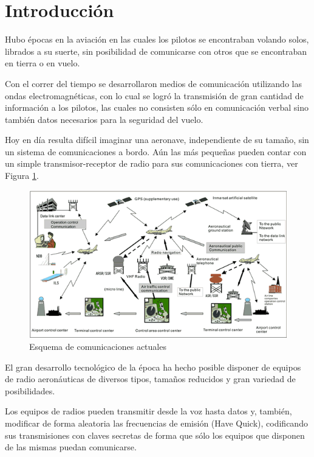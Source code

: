 \section{Introducci\'on}
\label{sec:comunicaciones.a.bordo.introduccion}

Hubo \'epocas en la aviaci\'on en las cuales los pilotos se encontraban volando solos, librados a su suerte, sin posibilidad de comunicarse con otros que se encontraban en tierra o en vuelo.

Con el correr del tiempo se desarrollaron medios de comunicaci\'on utilizando las ondas electromagn\'eticas, con lo cual se logr\'o la transmisi\'on de gran cantidad de informaci\'on a los pilotos, las cuales no consisten s\'olo en comunicaci\'on verbal sino tambi\'en datos necesarios para la seguridad del vuelo.

Hoy en d\'ia resulta dif\'icil imaginar una aeronave, independiente de su tama\~no, sin un sistema de comunicaciones a bordo. A\'un las m\'as peque\~nas pueden contar con un simple transmisor-receptor de radio para sus comunicaciones con tierra, ver Figura \ref{fig:U09.esquema.comunicaciones.actual}.

\begin{figure}[!h]
  \centering
   \includegraphics[width=\textwidth]{Imagenes.U09/comunicaciones.gif}
  \caption{Esquema de comunicaciones actuales}
  \label{fig:U09.esquema.comunicaciones.actual}
\end{figure}

El gran desarrollo tecnol\'ogico de la \'epoca ha hecho posible disponer de equipos de radio aeron\'auticas de diversos tipos, tama\~nos reducidos y gran variedad de posibilidades. 

Los equipos de radios pueden transmitir desde la voz hasta datos y, tambi\'en, modificar de forma aleatoria las frecuencias de emisi\'on (Have Quick), codificando sus transmisiones con claves secretas de forma que s\'olo los equipos que disponen de las mismas puedan comunicarse.


